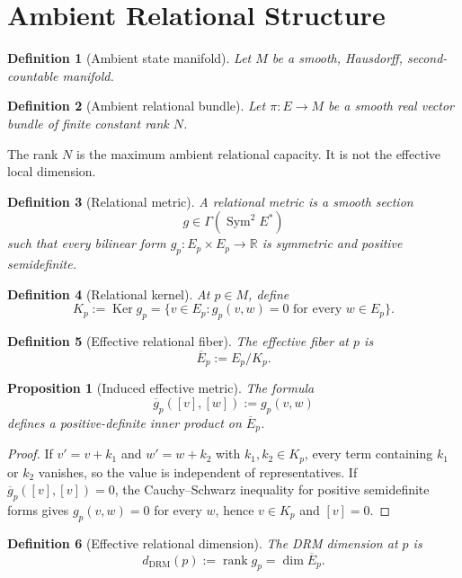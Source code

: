\documentclass[11pt]{article}
\newtheorem{definition}{Definition}[section]
\newtheorem{proposition}{Proposition}[section]
\newcommand{\R}{\mathbb{R}}
\newcommand{\Ker}{\operatorname{Ker}}
\newcommand{\rank}{\operatorname{rank}}
\begin{document}
\section{Ambient Relational Structure}
\label{sec:ambient}

\begin{definition}[Ambient state manifold]
Let $M$ be a smooth, Hausdorff, second-countable manifold.
\end{definition}

\begin{definition}[Ambient relational bundle]
Let $\pi:E\to M$ be a smooth real vector bundle of finite constant rank $N$.
\end{definition}

The rank $N$ is the maximum ambient relational capacity. It is not the
effective local dimension.

\begin{definition}[Relational metric]
A relational metric is a smooth section
\[
g\in\Gamma(\operatorname{Sym}^2E^*)
\]
such that every bilinear form $g_p:E_p\times E_p\to\R$ is symmetric and
positive semidefinite.
\end{definition}

\begin{definition}[Relational kernel]
At $p\in M$, define
\[
K_p:=\Ker g_p
=\{v\in E_p:g_p(v,w)=0\text{ for every }w\in E_p\}.
\]
\end{definition}

\begin{definition}[Effective relational fiber]
The effective fiber at $p$ is
\[
\overline E_p:=E_p/K_p.
\]
\end{definition}

\begin{proposition}[Induced effective metric]
The formula
\[
\overline g_p([v],[w]):=g_p(v,w)
\]
defines a positive-definite inner product on $\overline E_p$.
\end{proposition}

\begin{proof}
If $v'=v+k_1$ and $w'=w+k_2$ with $k_1,k_2\in K_p$, every term containing
$k_1$ or $k_2$ vanishes, so the value is independent of representatives. If
$\overline g_p([v],[v])=0$, the Cauchy--Schwarz inequality for positive
semidefinite forms gives $g_p(v,w)=0$ for every $w$, hence $v\in K_p$ and
$[v]=0$.
\end{proof}

\begin{definition}[Effective relational dimension]
The DRM dimension at $p$ is
\[
d_{\mathrm{DRM}}(p):=\rank g_p=\dim\overline E_p.
\]
\end{definition}
\end{document}
